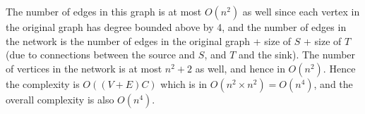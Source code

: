 \documentclass[answers]{exam}
\begin{document}
\begin{questions}
\begin{solution}
        The number of edges in this graph is at most $O(n^2)$ as well since each vertex in the original graph has degree bounded above by 4,
        and the number of edges in the network is the number of edges in the original graph + size of $S$ + size of $T$ (due to connections between the source and $S$, and $T$ and the sink). The number of vertices in
        the network is at most $n^2 + 2$ as well, and hence in $O(n^2)$. Hence the complexity is $O((V + E)C)$ which is in $O(n^2 \times n^2) = O(n^4)$, and the overall complexity is also $O(n^4)$.


    \end{solution}

\end{questions}
\end{document}
